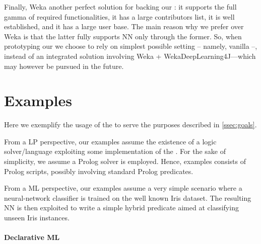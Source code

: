 \documentclass[12pt,a4paper,openright,twoside]{book}
\begin{document}
%
Finally, Weka another perfect solution for backing our \mllib{}: it supports the full gamma of required functionalities, it has a large contributors list, it is well established, and it has a large user base.
%
The main reason why we prefer \dlfj{} over Weka is that the latter fully supports NN only through the former.
%
So, when prototyping our \mllib{} we choose to rely on simplest possible setting -- namely, vanilla \dlfj{} --, instead of an integrated solution involving Weka + WekaDeepLearning4J---which may however be pursued in the future.
%

\section{\mllib{} Examples}
\label{sec:examples}

Here we exemplify the usage of the \mllib{} to serve the purposes described in \cref{ssec:goals}.

From a LP perspective, our examples assume the existence of a logic solver/language exploiting some implementation of the \mllib{}.
%
For the sake of simplicity, we assume a Prolog solver is employed.
%
Hence, examples consists of Prolog scripts, possibly involving standard Prolog predicates.

From a ML perspective, our examples assume a very simple scenario where a neural-network classifier is trained on the well known Iris dataset\footnotemark.
%
The resulting NN is then exploited to write a simple hybrid predicate aimed at classifying unseen Iris instances.
%

\paragraph{Declarative ML}
\end{document}
